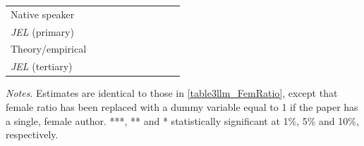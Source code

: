 \begin{table}
\begin{threeparttable}
\begin{tabular}{p{3cm}S@{}S@{}S@{}S@{}S@{}S@{}S@{}S@{}S@{}}
            Native speaker                &               &               &               &               &           {}   &           {}   &           {}   &           {}   &           {}   \\
            \textit{JEL} (primary)        &               &               &               &               &               &               &           {}   &               &               \\
            Theory/empirical              &               &               &               &               &               &               &               &           {}   &               \\
            \textit{JEL} (tertiary)       &               &               &               &               &               &               &               &               &           {}   \\
            \bottomrule
        \end{tabular}
        \begin{tablenotes}
            \tiny
            \item \textit{Notes}. Estimates are identical to those in \autoref{table3llm_FemRatio}, except that female ratio has been replaced with a dummy variable equal to 1 if the paper has a single, female author. ***, ** and * statistically significant at 1\%, 5\% and 10\%, respectively.
        \end{tablenotes}
    \end{threeparttable}
\end{table}